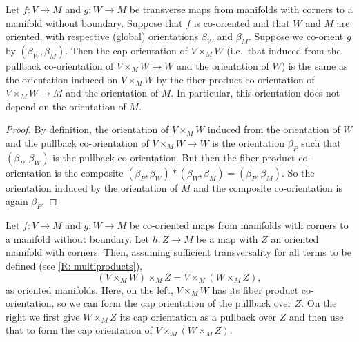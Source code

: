 \begin{lemma}\label{L: same induced}
	Let $f \colon V \to M$ and $g \colon W \to M$ be transverse maps from manifolds with corners to a manifold without boundary.
	Suppose that $f$ is co-oriented and that $W$ and $M$ are oriented, with respective (global) orientations $\beta_W$ and $\beta_M$.
	Suppose we co-orient $g$ by $(\beta_W,\beta_M)$.
	Then the cap orientation of $V \times_M W$ (i.e.\ that induced from the pullback co-orientation of $V \times_M W \to W$ and the orientation of $W$) is the same as the orientation induced on $V \times_M W$ by the fiber product co-orientation of $V \times_M W \to M$ and the orientation of $M$.
	In particular, this orientation does not depend on the orientation of $M$.
\end{lemma}

\begin{proof}
	By definition, the orientation of $V \times_M W$ induced from the orientation of $W$ and the pullback co-orientation of $V \times_M W \to W$ is the orientation $\beta_P$ such that $(\beta_P,\beta_W)$ is the pullback co-orientation.
	But then the fiber product co-orientation is the composite $(\beta_P,\beta_W)*(\beta_W,\beta_M) = (\beta_P,\beta_M)$.
	So the orientation induced by the orientation of $M$ and the composite co-orientation is again $\beta_P$.
\end{proof}

\begin{proposition}\label{P: OC mixed associativity}
	Let $f \colon V \to M$ and $g \colon W \to M$ be co-oriented maps from manifolds with corners to a manifold without boundary.
	Let $h \colon Z \to M$ be a map with $Z$ an oriented manifold with corners.
	Then, assuming sufficient transversality for all terms to be defined (see \cref{R: multiproducts}),
	$$(V \times_M W) \times_M Z = V \times_M (W \times_M Z),$$
	as oriented manifolds.
	Here, on the left, $V \times_M W$ has its fiber product co-orientation, so we can form the cap orientation of the pullback over $Z$.
	On the right we first give $W \times_M Z$ its cap orientation as a pullback over $Z$ and then use that to form the cap orientation of $V \times_M (W \times_M Z)$.
\end{proposition}



